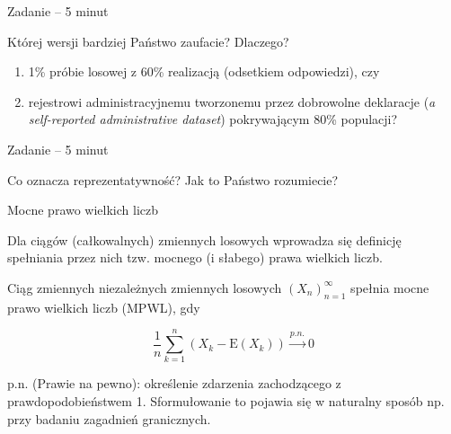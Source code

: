 \documentclass[10pt,ignorenonframetext, aspectratio=169]{beamer}
\begin{document}
    



\begin{frame}{Zadanie -- 5 minut}

\begin{center}
\large

    Której wersji bardziej Państwo zaufacie? Dlaczego?
    
    \vspace{0.5cm}
    
    \begin{enumerate}
        \item 1\% próbie losowej z 60\% realizacją (odsetkiem odpowiedzi), czy 
        \item rejestrowi administracyjnemu tworzonemu przez dobrowolne deklaracje (\textit{a self-reported administrative dataset}) pokrywającym 80\% populacji?
    \end{enumerate}
\end{center}
\end{frame}

\begin{frame}{Zadanie -- 5 minut}
\begin{center}
\large
    Co oznacza reprezentatywność? Jak to Państwo rozumiecie? 
\end{center}
\end{frame}


\begin{frame}{Mocne prawo wielkich liczb}

Dla ciągów (całkowalnych) zmiennych losowych wprowadza się definicję spełniania przez nich tzw. mocnego (i słabego) prawa wielkich liczb.

Ciąg zmiennych niezależnych zmiennych losowych $\left(X_{n}\right)_{n=1}^{\infty}$ spełnia mocne prawo wielkich liczb (MPWL), gdy

\begin{equation}
\frac{1}{n} \sum_{k=1}^{n}\left(X_{k}-\mathrm{E} (X_{k})\right) \stackrel{p . n .}{\longrightarrow} 0
\end{equation}

p.n. (Prawie na pewno): określenie zdarzenia zachodzącego z pra\-wdo\-po\-do\-bień\-stwem 1. Sformułowanie to pojawia się w naturalny sposób np. przy badaniu zagadnień granicznych.
\end{frame}
\end{document}
